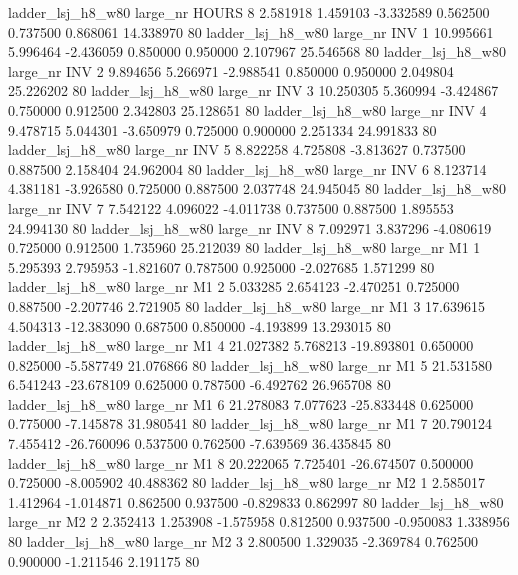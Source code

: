   ladder_lsj_h8_w80   large_nr    HOURS                 8  2.581918  1.459103  -3.332589 0.562500 0.737500  0.868061   14.338970 80
  ladder_lsj_h8_w80   large_nr      INV                 1 10.995661  5.996464  -2.436059 0.850000 0.950000  2.107967   25.546568 80
  ladder_lsj_h8_w80   large_nr      INV                 2  9.894656  5.266971  -2.988541 0.850000 0.950000  2.049804   25.226202 80
  ladder_lsj_h8_w80   large_nr      INV                 3 10.250305  5.360994  -3.424867 0.750000 0.912500  2.342803   25.128651 80
  ladder_lsj_h8_w80   large_nr      INV                 4  9.478715  5.044301  -3.650979 0.725000 0.900000  2.251334   24.991833 80
  ladder_lsj_h8_w80   large_nr      INV                 5  8.822258  4.725808  -3.813627 0.737500 0.887500  2.158404   24.962004 80
  ladder_lsj_h8_w80   large_nr      INV                 6  8.123714  4.381181  -3.926580 0.725000 0.887500  2.037748   24.945045 80
  ladder_lsj_h8_w80   large_nr      INV                 7  7.542122  4.096022  -4.011738 0.737500 0.887500  1.895553   24.994130 80
  ladder_lsj_h8_w80   large_nr      INV                 8  7.092971  3.837296  -4.080619 0.725000 0.912500  1.735960   25.212039 80
  ladder_lsj_h8_w80   large_nr       M1                 1  5.295393  2.795953  -1.821607 0.787500 0.925000 -2.027685    1.571299 80
  ladder_lsj_h8_w80   large_nr       M1                 2  5.033285  2.654123  -2.470251 0.725000 0.887500 -2.207746    2.721905 80
  ladder_lsj_h8_w80   large_nr       M1                 3 17.639615  4.504313 -12.383090 0.687500 0.850000 -4.193899   13.293015 80
  ladder_lsj_h8_w80   large_nr       M1                 4 21.027382  5.768213 -19.893801 0.650000 0.825000 -5.587749   21.076866 80
  ladder_lsj_h8_w80   large_nr       M1                 5 21.531580  6.541243 -23.678109 0.625000 0.787500 -6.492762   26.965708 80
  ladder_lsj_h8_w80   large_nr       M1                 6 21.278083  7.077623 -25.833448 0.625000 0.775000 -7.145878   31.980541 80
  ladder_lsj_h8_w80   large_nr       M1                 7 20.790124  7.455412 -26.760096 0.537500 0.762500 -7.639569   36.435845 80
  ladder_lsj_h8_w80   large_nr       M1                 8 20.222065  7.725401 -26.674507 0.500000 0.725000 -8.005902   40.488362 80
  ladder_lsj_h8_w80   large_nr       M2                 1  2.585017  1.412964  -1.014871 0.862500 0.937500 -0.829833    0.862997 80
  ladder_lsj_h8_w80   large_nr       M2                 2  2.352413  1.253908  -1.575958 0.812500 0.937500 -0.950083    1.338956 80
  ladder_lsj_h8_w80   large_nr       M2                 3  2.800500  1.329035  -2.369784 0.762500 0.900000 -1.211546    2.191175 80
